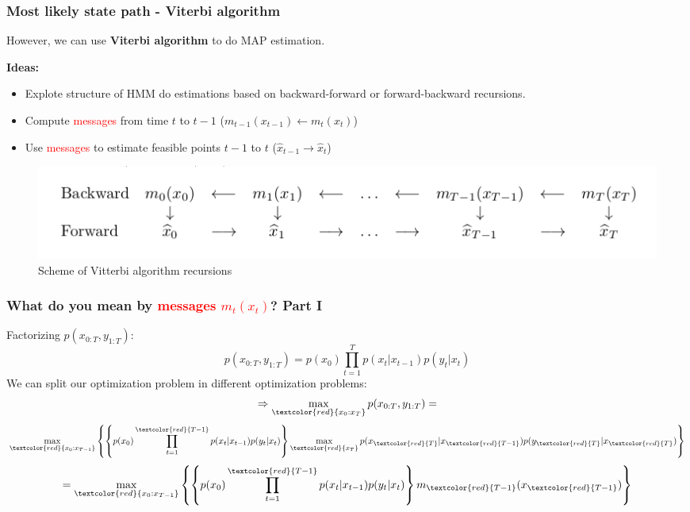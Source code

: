 \documentclass[xcolor=dvipsnames, compress]{beamer}
\begin{document}
\begin{frame}
\frametitle{Most likely state path - Viterbi algorithm}

However, we can use \textbf{Viterbi algorithm} to do MAP estimation.

\textbf{Ideas:}

\begin{itemize}
	\item Explote structure of HMM do estimations based on backward-forward or forward-backward recursions.
	\item Compute \textcolor{red}{messages} from time $t$  to $t-1$ ($m_{t-1}(x_{t-1}) \leftarrow m_{t}(x_{t})$)
	\item Use \textcolor{red}{messages} to estimate feasible points $t-1$  to $t$ ($\hat{x}_{t-1} \rightarrow \hat{x}_{t}$)	
\end{itemize}

\begin{figure}
	\includegraphics[scale=0.4]{images/viterbi1.jpg}
	\caption{Scheme of Vitterbi algorithm recursions}
\end{figure}

\end{frame}

\begin{frame}
\frametitle{What do you mean by \textcolor{red}{messages $m_t(x_t)$}? Part I}

Factorizing $p(x_{0:T},y_{1:T})$:
$$p(x_{0:T},y_{1:T}) = p(x_0)\prod_{t=1}^T p(x_{t}|x_{t-1}) p(y_{t}|x_{t})$$
We can split our optimization problem in different optimization problems:
$$\Rightarrow \max_{ \textcolor{red}{ x_0:x_T} } p(x_{0:T},y_{1:T}) =$$ 
$$ \max_{ \textcolor{red}{ x_0:x_{T-1}} } \left\{ \left\{ p(x_0)  \prod_{t=1}^{\textcolor{red}{T-1}} p(x_{t}|x_{t-1}) p(y_{t}|x_{t}) \right\} \max_{ \textcolor{red}{ x_{T}} } p(x_{\textcolor{red}{T}}|x_{\textcolor{red}{T-1}}) p(y_{\textcolor{red}{T}}|x_{\textcolor{red}{T}})  \right \}$$
$$=\max_{ \textcolor{red}{ x_0:x_{T-1}} } \left\{ \left\{ p(x_0)  \prod_{t=1}^{\textcolor{red}{T-1}} p(x_{t}|x_{t-1}) p(y_{t}|x_{t}) \right\} m_{\textcolor{red}{T-1}}(x_{\textcolor{red}{T-1}})  \right \}$$

\end{frame}
\end{document}
